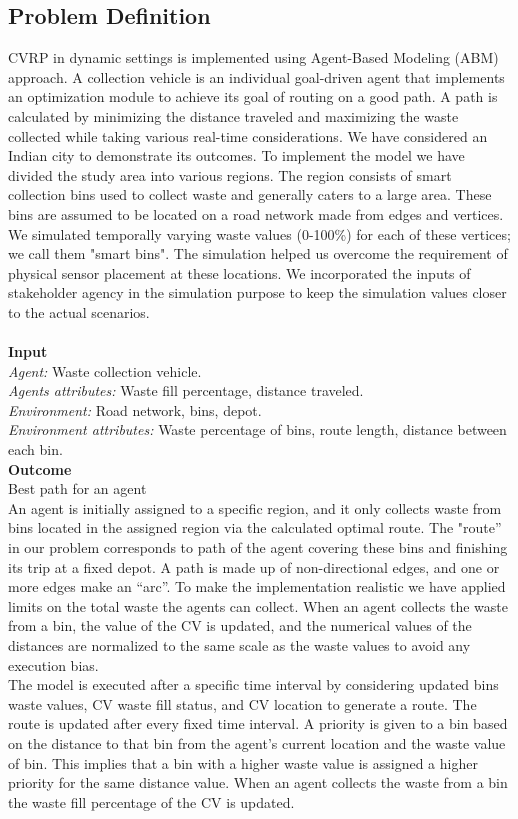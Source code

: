 \documentclass[12pt]{article}
\begin{document}
\subsection{Problem Definition}
CVRP in dynamic settings is implemented using Agent-Based Modeling (ABM) approach. A collection vehicle is an individual goal-driven agent that implements an optimization module to achieve its goal of routing on a good path. A path is calculated by minimizing the distance traveled and maximizing the waste collected while taking various real-time considerations. We have considered an Indian city to demonstrate its outcomes. To implement the model we have divided the study area into various regions. The region consists of smart collection bins used to collect waste and generally caters to a large area. These bins are assumed to be located on a road network made from edges and vertices. We simulated temporally varying waste values (0-100\%) for each of these vertices; we call them "smart bins". The simulation helped us overcome the requirement of physical sensor placement at these locations. We incorporated the inputs of stakeholder agency in the simulation purpose to keep the simulation values closer to the actual scenarios.\\
\\
\textbf {Input}\\
\textit {Agent:} Waste collection vehicle.\\
\textit {Agents attributes:} Waste fill percentage, distance traveled.  \\
\textit {Environment:} Road network, bins, depot.  \\
\textit {Environment attributes:} Waste percentage of bins, route length, distance between each bin.\\
\textbf{Outcome}\\
Best path for an agent\\

An agent is initially assigned to a specific region, and it only collects waste from bins located in the assigned region via the calculated optimal route. The "route” in our problem corresponds to path of the agent covering these bins and finishing its trip at a fixed depot. A path is made up of non-directional edges, and one or more edges make an “arc”. To make the implementation realistic we have applied limits on the total waste the agents can collect. When an agent collects the waste from a bin, the value of the CV is updated, and the numerical values of the distances are normalized to the same scale as the waste values to avoid any execution bias.\\ The model is executed after a specific time interval by considering updated bins waste values, CV waste fill status, and CV location to generate a route. The route is updated after every fixed time interval. A priority is given to a bin based on the distance to that bin from the agent's current location and the waste value of bin. This implies that a bin with a higher waste value is assigned a higher priority for the same distance value. When an agent collects the waste from a bin the waste fill percentage of the CV is updated.\\ 
\end{document}

